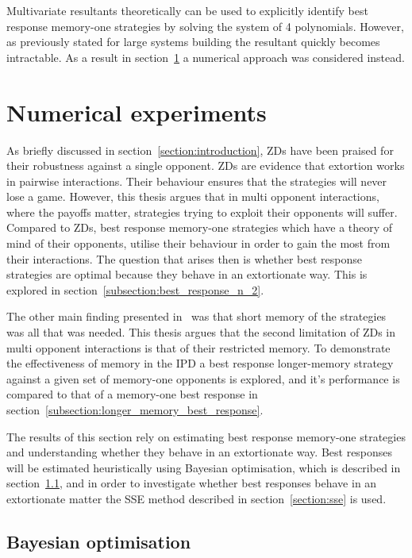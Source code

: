 Multivariate resultants theoretically can be used to explicitly identify best
response memory-one strategies by solving the system of 4 polynomials. However,
as previously stated for large systems building the resultant quickly becomes
intractable. As a result in section~\ref{section:numerical_experiments}
a numerical approach was considered instead.

\section{Numerical experiments} \label{section:numerical_experiments}

As briefly discussed in section~\ref{section:introduction}, ZDs have been
praised for their robustness against a single opponent. ZDs are evidence that
extortion works in pairwise interactions. Their behaviour ensures that the
strategies will never lose a game. However, this thesis argues that in multi
opponent interactions, where the payoffs matter, strategies trying to exploit
their opponents will suffer. Compared to ZDs, best response memory-one
strategies which have a theory of mind of their opponents, utilise their
behaviour in order to gain the most from their interactions. The question that
arises then is whether best response strategies are optimal because they behave
in an extortionate way. This is explored in
section~\ref{subsection:best_response_n_2}.

The other main finding presented in~\cite{Press2012} was that short memory of
the strategies was all that was needed. This thesis argues that the second
limitation of ZDs in multi opponent interactions is that of their restricted
memory. To demonstrate the effectiveness of memory in the IPD a best response
longer-memory strategy against a given set of memory-one opponents is explored,
and it's performance is compared to that of a memory-one best response in
section~\ref{subsection:longer_memory_best_response}.

The results of this section rely on estimating best response memory-one
strategies and understanding whether they behave in an extortionate way. Best
responses will be estimated heuristically using Bayesian optimisation, which is
described in section~\ref{section:bayesian_optimisation}, and in order to
investigate whether best responses behave in an extortionate matter the SSE
method described in section~\ref{section:sse} is used.

\subsection{Bayesian optimisation}\label{section:bayesian_optimisation}

